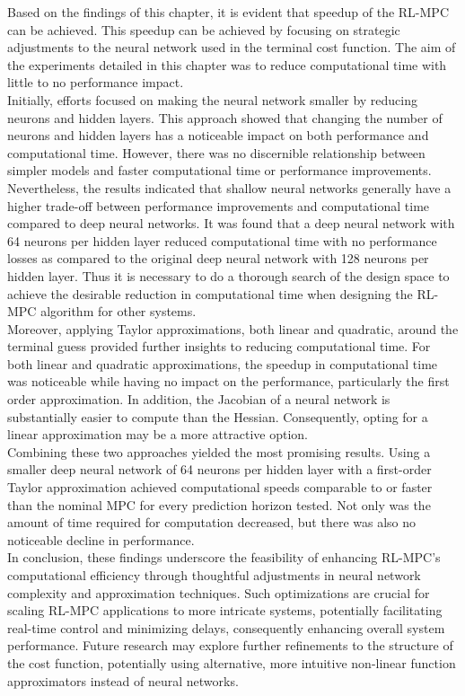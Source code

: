 Based on the findings of this chapter, it is evident that speedup of the RL-MPC can be achieved. This speedup can be achieved by focusing on strategic adjustments to the neural network used in the terminal cost function. The aim of the experiments detailed in this chapter was to reduce computational time with little to no performance impact.\\
Initially, efforts focused on making the neural network smaller by reducing neurons and hidden layers. This approach showed that changing the number of neurons and hidden layers has a noticeable impact on both performance and computational time. However, there was no discernible relationship between simpler models and faster computational time or performance improvements. Nevertheless, the results indicated that shallow neural networks generally have a higher trade-off between performance improvements and computational time compared to deep neural networks. It was found that a deep neural network with 64 neurons per hidden layer reduced computational time with no performance losses as compared to the original deep neural network with 128 neurons per hidden layer. Thus it is necessary to do a thorough search of the design space to achieve the desirable reduction in computational time when designing the RL-MPC algorithm for other systems.\\
Moreover, applying Taylor approximations, both linear and quadratic, around the terminal guess provided further insights to reducing computational time. For both linear and quadratic approximations, the speedup in computational time was noticeable while having no impact on the performance, particularly the first order approximation. In addition, the Jacobian of a neural network is substantially easier to compute than the Hessian. Consequently, opting for a linear approximation may be a more attractive option.\\
Combining these two approaches yielded the most promising results. Using a smaller deep neural network of 64 neurons per hidden layer with a first-order Taylor approximation achieved computational speeds comparable to or faster than the nominal MPC for every prediction horizon tested. Not only was the amount of time required for computation decreased, but there was also no noticeable decline in performance.\\
In conclusion, these findings underscore the feasibility of enhancing RL-MPC's computational efficiency through thoughtful adjustments in neural network complexity and approximation techniques. Such optimizations are crucial for scaling RL-MPC applications to more intricate systems, potentially facilitating real-time control and minimizing delays, consequently enhancing overall system performance. Future research may explore further refinements to the structure of the cost function, potentially using alternative, more intuitive non-linear function approximators instead of neural networks.



